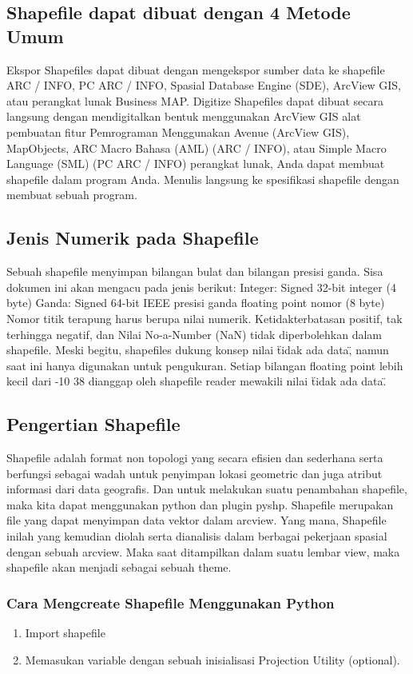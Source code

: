 \subsection{Shapefile dapat dibuat dengan 4 Metode Umum}
Ekspor Shapefiles dapat dibuat dengan mengekspor sumber data ke shapefile
ARC / INFO, PC ARC / INFO, Spasial Database Engine (SDE), ArcView GIS,
atau perangkat lunak Business MAP.
Digitize Shapefiles dapat dibuat secara langsung dengan mendigitalkan bentuk menggunakan ArcView GIS
alat pembuatan fitur
Pemrograman Menggunakan Avenue (ArcView GIS), MapObjects, ARC Macro
Bahasa (AML) (ARC / INFO), atau Simple Macro Language (SML)
(PC ARC / INFO) perangkat lunak, Anda dapat membuat shapefile dalam program Anda.
Menulis langsung ke spesifikasi shapefile dengan membuat sebuah program. 

\subsection{Jenis Numerik pada Shapefile}
Sebuah shapefile menyimpan bilangan bulat dan bilangan presisi ganda. Sisa dokumen ini 
akan mengacu pada jenis berikut: 
Integer: Signed 32-bit integer (4 byte) 
Ganda: Signed 64-bit IEEE presisi ganda floating point nomor (8 byte) 
Nomor titik terapung harus berupa nilai numerik. Ketidakterbatasan positif, tak terhingga negatif, dan 
Nilai No-a-Number (NaN) tidak diperbolehkan dalam shapefile. Meski begitu, shapefiles 
dukung konsep nilai \"tidak ada data\", namun saat ini hanya digunakan untuk pengukuran. 
Setiap bilangan floating point lebih kecil dari -10 38 dianggap oleh shapefile reader 
mewakili nilai \"tidak ada data\". 

\subsection{Pengertian Shapefile}
	Shapefile adalah format non topologi yang secara efisien dan sederhana serta berfungsi sebagai wadah untuk penyimpan lokasi geometric dan juga atribut informasi dari data geografis. Dan untuk melakukan suatu penambahan shapefile, maka kita dapat menggunakan python dan plugin pyshp. Shapefile merupakan file yang dapat menyimpan data vektor dalam arcview. Yang mana, Shapefile inilah yang kemudian diolah serta dianalisis dalam berbagai pekerjaan spasial dengan sebuah arcview. Maka saat ditampilkan dalam suatu lembar view, maka shapefile  akan menjadi sebagai sebuah theme.

\subsubsection{Cara Mengcreate Shapefile Menggunakan Python}
\begin{enumerate}
    \item Import shapefile
    \item Memasukan variable dengan sebuah inisialisasi
Projection Utility (optional).
\end{enumerate}

